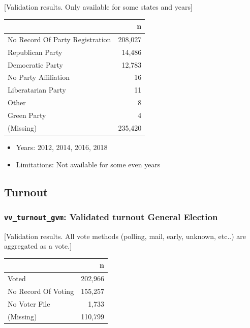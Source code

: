 \documentclass[10pt,article,oneside]{memoir}
\theoremstyle{definition}
\begin{document}
{[}Validation results. Only available for some states and years{]}

\begin{table}[H]
\centering
\begin{tabular}{lr}
\toprule
 & n\\
\midrule
No Record Of Party Registration & 208,027\\
Republican Party & 14,486\\
Democratic Party & 12,783\\
No Party Affiliation & 16\\
Liberatarian Party & 11\\
Other & 8\\
Green Party & 4\\
(Missing) & 235,420\\
\bottomrule
\end{tabular}
\end{table}

\begin{itemize}
\tightlist
\item
  Years: 2012, 2014, 2016, 2018
\item
  Limitations: Not available for some even years
\end{itemize}

\hypertarget{turnout}{%
\subsection{Turnout}\label{turnout}}

\hypertarget{vv_turnout_gvm-validated-turnout-general-election}{%
\subsubsection{\texorpdfstring{\texttt{vv\_turnout\_gvm}: Validated
turnout General
Election}{vv\_turnout\_gvm: Validated turnout General Election}}\label{vv_turnout_gvm-validated-turnout-general-election}}

{[}Validation results. All vote methods (polling, mail, early, unknown,
etc..) are aggregated as a vote.{]}

\begin{table}[H]
\centering
\begin{tabular}{lr}
\toprule
 & n\\
\midrule
Voted & 202,966\\
No Record Of Voting & 155,257\\
No Voter File & 1,733\\
(Missing) & 110,799\\
\bottomrule
\end{tabular}
\end{table}
\end{document}
